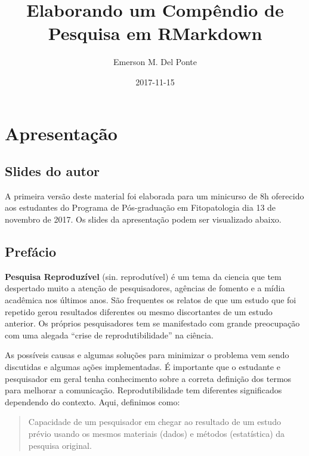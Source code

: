 \documentclass[]{book}
\title{Elaborando um Compêndio de Pesquisa em RMarkdown}
\author{Emerson M. Del Ponte}
\date{2017-11-15}
\begin{document}
\maketitle

{
\setcounter{tocdepth}{1}
\tableofcontents
}
\hypertarget{apresentacao}{%
\chapter{Apresentação}\label{apresentacao}}

\hypertarget{slides-do-autor}{%
\section*{Slides do autor}\label{slides-do-autor}}

A primeira versão deste material foi elaborada para um minicurso de 8h
oferecido aos estudantes do Programa de Pós-graduação em Fitopatologia
dia 13 de novembro de 2017. Os slides da apresentação podem ser
visualizado abaixo.

\hypertarget{prefacio}{%
\section*{Prefácio}\label{prefacio}}

\textbf{Pesquisa Reproduzível} (sin. reprodutível) é um tema da ciencia
que tem despertado muito a atenção de pesquisadores, agências de fomento
e a mídia acadêmica nos últimos anos. São frequentes os relatos de que
um estudo que foi repetido gerou resultados diferentes ou mesmo
discortantes de um estudo anterior. Os próprios pesquisadores tem se
manifestado com grande preocupação com uma alegada ``crise de
reprodutibilidade'' na ciência.

As possíveis causas e algumas soluções para minimizar o problema vem
sendo discutidas e algumas ações implementadas. É importante que o
estudante e pesquisador em geral tenha conhecimento sobre a correta
definição dos termos para melhorar a comunicação. Reprodutibilidade tem
diferentes significados dependendo do contexto. Aqui, definimos como:

\begin{quote}
Capacidade de um pesquisador em chegar ao resultado de um estudo prévio
usando os mesmos materiais (dados) e métodos (estatística) da pesquisa
original.
\end{quote}
\end{document}

